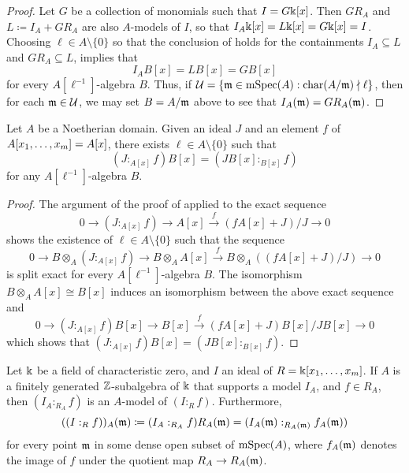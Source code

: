 \documentclass{amsart}
\begin{document}
\begin{proof}
   Let $G$ be a collection of monomials such that $I=G\Bbbk[x]$.
   Then $GR_A$ and $L \coloneqq I_A + G R_A$ are also $A$-models of $I$, so that $I_A \Bbbk[x] = L\Bbbk[x] = G \Bbbk[x] = I$.
   Choosing $\ell \in A \setminus \{0\}$ so that the conclusion of  holds for the containments $I_A \subseteq L$ and $GR_A \subseteq L$,  implies that
      \[
      I_A B[x] = L B[x] = G B[x]
   \]
   for every $A[\ell^{-1}]$-algebra $B$.
   Thus, if $\mathcal{U} = \{ \mathfrak{m} \in \operatorname{mSpec}(A) : \operatorname{char}(A/\mathfrak{m}) \nmid \ell \}$,  then for each $\mathfrak{m} \in \mathcal{U}$, we may set $B=A/\mathfrak{m}$ above to see that $I_A(\mathfrak{m}) = G R_A(\mathfrak{m})$.
\end{proof}

\begin{proposition}
   \label{colon mod p: P}
   Let $A$ be a Noetherian domain.
   Given an ideal $J$ and an element $f$ of $A[x_1, \ldots, x_m] = A[x]$, there exists $\ell \in A \setminus \{0\}$ such that
   \[
      (J:_{A[x]} f)B[x] = (JB[x] :_{B[x]} f)
   \]
   for any $A[\ell^{-1}]$-algebra $B$.
\end{proposition}

\begin{proof}
   The argument of the proof of  applied to the exact sequence
    \[
       0 \to (J :_{A[x]} f) \to A[x] \stackrel{f}{\longrightarrow} (f A[x] + J)/J \to 0
    \]
    shows the existence of $\ell \in A \setminus \{0\}$ such that the sequence
    \[
       0 \to B \otimes_A (J :_{A[x]} f) \to B \otimes_A A[x] \stackrel{f}{\longrightarrow} B \otimes_A ((f A[x] + J)/J) \to 0
    \]
    is split exact for every $A[\ell^{-1}]$-algebra $B$.
    The isomorphism $B \otimes_A A[x] \cong B[x]$ induces an isomorphism between the above exact sequence and
    \[
       0 \to (J :_{A[x]} f) B[x] \to  B[x] \stackrel{f}{\longrightarrow} (f A[x] + J)B[x]/JB[x] \to 0
    \]
    which shows that $(J:_{A[x]} f)B[x] = (JB[x] :_{B[x]} f)$.
\end{proof}

\begin{corollary}
   \label{colon mod p: C}
   Let $\Bbbk$ be a field of characteristic zero, and $I$ an ideal of $R=\Bbbk[x_1, \ldots, x_m]$.
   If $A$ is a finitely generated $\mathbb{Z}$-subalgebra of $\Bbbk$ that supports a model $I_A$, and $f \in R_A$, then  $(I_A :_{R_A} f)$ is an $A$-model of $(I:_R f)$.
   Furthermore, 
   \[ ((I :_R f))_A(\mathfrak{m}) \coloneqq (I_A :_{R_A} f) R_A(\mathfrak{m}) = (I_A(\mathfrak{m}) :_{R_A(\mathfrak{m})} f_A(\mathfrak{m})) \]
   for every point $\mathfrak{m}$ in some dense open subset of $\operatorname{mSpec}(A)$, where $f_A(\mathfrak{m})$ denotes the image of $f$ under the quotient map $R_A \to R_A(\mathfrak{m})$.
 \end{corollary}
\end{document}
